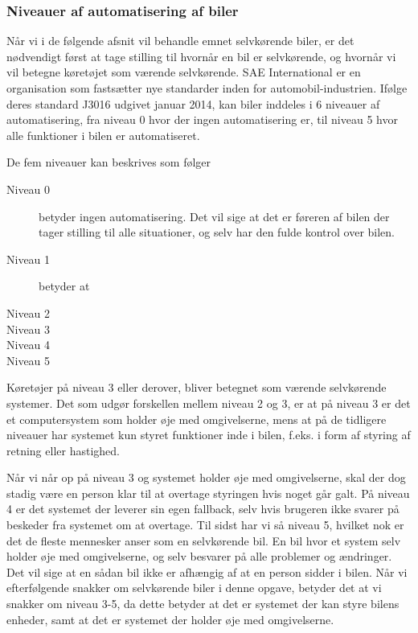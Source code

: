 \subsubsection{Niveauer af automatisering af biler}
Når vi i de følgende afsnit vil behandle emnet selvkørende biler, er det nødvendigt først at tage stilling til hvornår en bil er selvkørende, og hvornår vi vil betegne køretøjet som værende selvkørende. SAE International er en organisation som fastsætter nye standarder inden for automobil-industrien. Ifølge deres standard J3016 udgivet januar 2014, kan biler inddeles i 6 niveauer af automatisering, fra niveau 0 hvor der ingen automatisering er, til niveau 5 hvor alle funktioner i bilen er automatiseret\cite{SAE_J3016}. 

De fem niveauer kan beskrives som følger

\begin{description}
	\item[Niveau 0] betyder ingen automatisering. Det vil sige at det er føreren af bilen der tager stilling til alle situationer, og selv har den fulde kontrol over bilen.
	\item[Niveau 1] betyder at 
	\item[Niveau 2]
	\item[Niveau 3]
	\item[Niveau 4]
	\item[Niveau 5]
\end{description}

Køretøjer på niveau 3 eller derover, bliver betegnet som værende selvkørende systemer. Det som udgør forskellen mellem niveau 2 og 3, er at på niveau 3 er det et computersystem som holder øje med omgivelserne, mens at på de tidligere niveauer har systemet kun styret funktioner inde i bilen, f.eks. i form af styring af retning eller hastighed.

Når vi når op på niveau 3 og systemet holder øje med omgivelserne, skal der dog stadig være en person klar til at overtage styringen hvis noget går galt. På niveau 4 er det systemet der leverer sin egen fallback, selv hvis brugeren ikke svarer på beskeder fra systemet om at overtage. Til sidst har vi så niveau 5, hvilket nok er det de fleste mennesker anser som en selvkørende bil. En bil hvor et system selv holder øje med omgivelserne, og selv besvarer på alle problemer og ændringer. Det vil sige at en sådan bil ikke er afhængig af at en person sidder i bilen. Når vi efterfølgende snakker om selvkørende biler i denne opgave, betyder det at vi snakker om niveau 3-5, da dette betyder at det er systemet der kan styre bilens enheder, samt at det er systemet der holder øje med omgivelserne.

